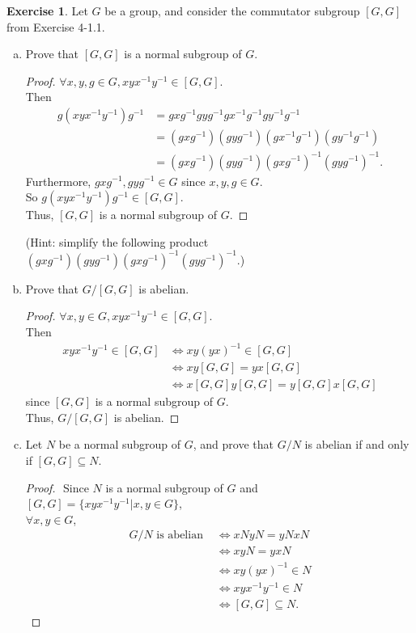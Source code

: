 \documentclass{amsart}
\theoremstyle{plain}
\theoremstyle{definition}
\newtheorem{exer}[lem]{Exercise}
\begin{document}
\begin{exer}
Let $G$ be a group, and consider the commutator subgroup $[G,G]$ from Exercise 4-1.1.
\begin{enumerate}[(a)]
\item Prove that $[G,G]$ is a normal subgroup of $G$.
	\begin{proof}
		$\forall x,y,g \in G, xyx^{-1}y^{-1} \in [G,G]$. \\
		Then 
		\begin{align*}
			g(xyx^{-1}y^{-1})g^{-1} &= gxg^{-1}gyg^{-1}gx^{-1}g^{-1}gy^{-1}g^{-1} \\
     			 		   		  &= (gxg^{-1})(gyg^{-1})(gx^{-1}g^{-1})(gy^{-1}g^{-1}) \\
    	   				  	      &=(gxg^{-1})(gyg^{-1})(gxg^{-1})^{-1}(gyg^{-1})^{-1}.	
		\end{align*}
		Furthermore, $gxg^{-1}, gyg^{-1} \in G$ since $x,y,g \in G$.\\
		So $g(xyx^{-1}y^{-1})g^{-1} \in [G,G]$.\\
		Thus, $[G,G]$ is a normal subgroup of $G$.
	\end{proof}
(Hint: simplify the following product $(gxg^{-1})(gyg^{-1})(gxg^{-1})^{-1}(gyg^{-1})^{-1}$.)
\item Prove that $G/[G,G]$ is abelian.
	\begin{proof}
		$\forall x,y\in G, xyx^{-1}y^{-1} \in [G,G]$.\\
		Then
		    \begin{align*}
		    	 xyx^{-1}y^{-1} \in [G,G] & \Longleftrightarrow xy(yx)^{-1} \in [G,G]\\
		    							  & \Longleftrightarrow xy[G,G] = yx[G,G]\\
		    							  & \Longleftrightarrow x[G,G]y[G,G] = y[G,G]x[G,G]
		    \end{align*}
		since $[G,G]$ is a normal subgroup of $G$.\\
		Thus, $G/[G,G]$ is abelian. 	
	\end{proof}
\item Let $N$ be a normal subgroup of $G$, and prove that $G/N$ is abelian if and only if $[G,G]\subseteq N$.
	\begin{proof}
		$ $\newline
		Since $N$ is a normal subgroup of $G$ and $[G,G] = \{xyx^{-1}y^{-1}|x,y \in G\}$, \\
		$\forall x,y\in G$, 
			\begin{align*}
				G/N \text{ is abelian } &\Longleftrightarrow xNyN = yNxN \\
				 & \Longleftrightarrow xyN = yxN\\
							& \Longleftrightarrow xy(yx)^{-1} \in N \\
				   &\Longleftrightarrow  xyx^{-1}y^{-1} \in N\\
				   &\Longleftrightarrow [G,G]\subseteq N.
			\end{align*}
	\end{proof}
\end{enumerate}
\end{exer}
\end{document}
